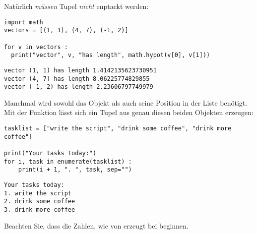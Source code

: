 Natürlich \emph{müssen} Tupel \emph{nicht} enptackt werden:
\begin{codebox}
\begin{verbatim}
import math
vectors = [(1, 1), (4, 7), (-1, 2)]

for v in vectors :
  print("vector", v, "has length", math.hypot(v[0], v[1]))
\end{verbatim}
\end{codebox}

\begin{cmdbox}
\begin{verbatim}
vector (1, 1) has length 1.4142135623730951
vector (4, 7) has length 8.06225774829855
vector (-1, 2) has length 2.23606797749979
\end{verbatim}
\end{cmdbox}


\begin{hintbox}
Manchmal wird sowohl das Objekt als auch seine Position in der Liste benötigt. Mit der Funktion  lässt sich ein Tupel aus genau diesen beiden Objekten erzeugen:

\begin{codebox}
\begin{verbatim}
tasklist = ["write the script", "drink some coffee", "drink more coffee"]

print("Your tasks today:")
for i, task in enumerate(tasklist) :
    print(i + 1, ". ", task, sep="")
\end{verbatim}
\end{codebox}

\begin{cmdbox}
\begin{verbatim}
Your tasks today:
1. write the script
2. drink some coffee
3. drink more coffee
\end{verbatim}
\end{cmdbox}

Beachten Sie, dass die Zahlen, wie von  erzeugt bei  beginnen.
\end{hintbox}


